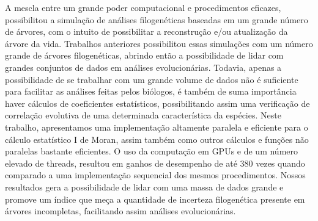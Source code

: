 
\begin{resumo} 
A mescla entre um grande poder computacional e procedimentos eficazes, possibilitou a simula\c{c}\~{a}o de an\'{a}lises filogen\'{e}ticas baseadas em um grande n\'{u}mero de \'{a}rvores, com o intuito de possibilitar a reconstru\c{c}\~{a}o e/ou atualiza\c{c}\~{a}o da \'{a}rvore da vida. Trabalhos anteriores possibilitou essas simula\c{c}\~{o}es com um n\'{u}mero grande de \'{a}rvores filogen\'{e}ticas, abrindo ent\~{a}o a possibilidade de lidar com grandes conjuntos de dados em an\'{a}lises evolucion\'{a}rias. Todavia, apenas a possibilidade de se trabalhar com um grande volume de dados n\~{a}o \'{e} suficiente para facilitar as an\'{a}lises feitas pelos bi\'{o}logos, \'{e} tamb\'{e}m de suma import\^ancia haver c\'{a}lculos de coeficientes estat\'{i}sticos, possibilitando assim uma verifica\c{c}\~{a}o de correla\c{c}\~{a}o evolutiva de uma determinada caracter\'{i}stica da esp\'{e}cies. Neste trabalho, apresentamos uma implementa\c{c}\~{a}o altamente paralela e eficiente para o c\'{a}lculo estat\'{i}stico I de Moran, assim tamb\'{e}m como outros c\'{a}lculos e fun\c{c}\~{o}es n\~{a}o paralelas bastante eficientes. O uso da computa\c{c}\~{a}o em GPUs e de um n\'{u}mero elevado de threads, resultou em ganhos de desempenho de at\'{e} 380 vezes quando comparado a uma implementa\c{c}\~{a}o sequencial dos mesmos procedimentos. Nossos resultados gera a possibilidade de lidar com uma massa de dados grande e promove um \'{i}ndice que meça a quantidade de incerteza filogen\'{e}tica presente em \'{a}rvores incompletas, facilitando assim an\'{a}lises evolucion\'{a}rias.
\end{resumo}

